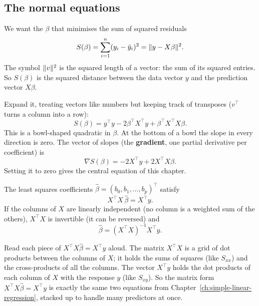 \subsection{The normal equations}

We want the $\beta$ that minimises the sum of squared residuals
\[
  S(\beta) = \sum_{i=1}^n (y_i - \hat y_i)^2 = \lVert y - X\beta\rVert^2 .
\]
The symbol $\lVert v\rVert^2$ is the squared length of a vector: the sum of its squared
entries. So $S(\beta)$ is the squared distance between the data vector $y$ and the
prediction vector $X\beta$.

Expand it, treating vectors like numbers but keeping track of transposes
($v^\top$ turns a column into a row):
\[
  S(\beta) = y^\top y - 2\beta^\top X^\top y + \beta^\top X^\top X \beta .
\]
This is a bowl-shaped quadratic in $\beta$. At the bottom of a bowl the slope in every
direction is zero. The vector of slopes (the \textbf{gradient}, one partial
derivative per coefficient) is
\[
  \nabla S(\beta) = -2X^\top y + 2X^\top X\beta .
\]
Setting it to zero gives the central equation of this chapter.

\begin{theorem}
The least squares coefficients $\hat\beta = (b_0, b_1, \dots, b_p)^\top$ satisfy
\[
  X^\top X\,\hat\beta = X^\top y .
\]
If the columns of $X$ are linearly independent (no column is a weighted sum of the others), $X^\top X$ is invertible (it can be reversed) and
\[
  \hat\beta = (X^\top X)^{-1} X^\top y .
\]
\end{theorem}

Read each piece of $X^\top X \hat\beta = X^\top y$ aloud. The matrix $X^\top X$ is a grid of dot products between the columns of $X$; it holds the sums of squares (like $S_{xx}$) and the cross-products of all the columns. The vector $X^\top y$ holds the dot products of each column of $X$ with the response $y$ (like $S_{xy}$). So the matrix form $X^\top X \hat\beta = X^\top y$ is exactly the same two equations from Chapter~\ref{ch:simple-linear-regression}, stacked up to handle many predictors at once.

